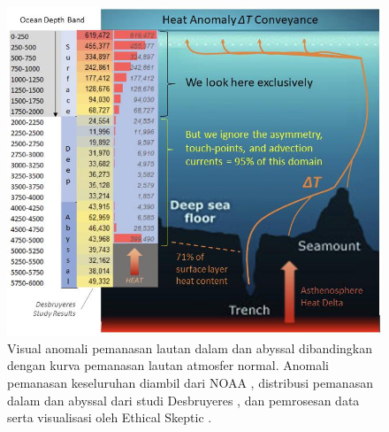 \documentclass[10pt,twocolumn,letterpaper]{article}
\begin{document}
\begin{figure}[t]
\begin{center}
\includegraphics[width=1\textwidth]{deepsea.jpg}
\end{center}
   \caption{Visual anomali pemanasan lautan dalam dan abyssal dibandingkan dengan kurva pemanasan lautan atmosfer normal. Anomali pemanasan keseluruhan diambil dari NOAA \cite{147}, distribusi pemanasan dalam dan abyssal dari studi Desbruyeres \cite{132}, dan pemrosesan data serta visualisasi oleh Ethical Skeptic \cite{129}.}
\label{fig:21}
\end{figure}
\end{document}
